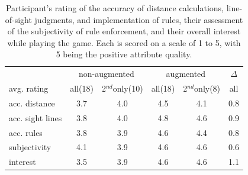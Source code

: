 \documentclass[10pt,twocolumn,letterpaper]{article}
\begin{document}
\begin{table}[tb]
\begin{center}
\begin{tabular}{@{}l|c@{~}c|c@{~}c|c@{}}
                & \multicolumn{2}{c|}{{\small non-augmented}} & \multicolumn{2}{c|}{{\small augmented}} & {\small $\Delta$} \\
{\small avg. rating    } & {\small all(18)} & {\small 2$^{nd}$only(10)} & {\small all(18)} & {\small 2$^{nd}$only(8)} & {\small all} \\ \hline
{\small acc. distance  } & \small 3.7 & \small 4.0 & \small 4.5 & \small 4.1 & \small 0.8 \\
{\small acc. sight lines} & \small 3.8 & \small 4.0 & \small 4.8 & \small 4.6 & \small 0.9 \\
{\small acc. rules     } & \small 3.8 & \small 3.9 & \small 4.6 & \small 4.4 & \small 0.8 \\
{\small subjectivity   } & \small 4.1 & \small 3.9 & \small 4.6 & \small 4.6 & \small 0.6 \\
{\small interest       } & \small 3.5 & \small 3.9 & \small 4.6 & \small 4.6 & \small 1.1 \\
\end{tabular}
\end{center}%
\vspace{-0.05in}
\caption{Participant's rating of the accuracy of distance
  calculations, line-of-sight judgments, and implementation of rules,
  their assessment of the subjectivity of rule enforcement, and their
  overall interest while playing the game.  Each is scored on a scale
  of 1 to 5, with 5 being the positive attribute quality.
\label{table:questionnaire}
\vspace{-0.1in}
}
\end{table}
\end{document}
